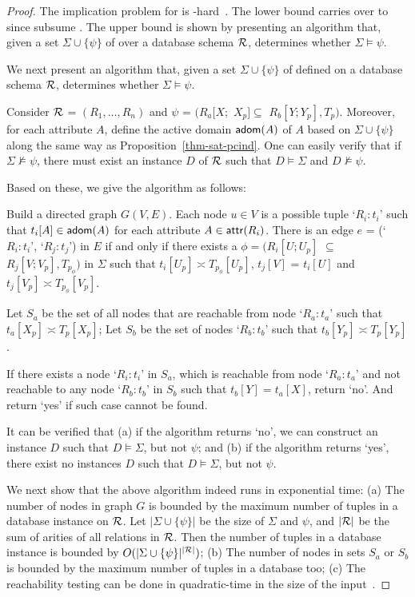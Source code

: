 \begin{proof} 
The implication problem for \CINDs is
\EXPTIME-hard~\cite{tcs-CINDs}. The lower bound carries over to \pCINDs
since \pCINDs subsume \CINDs. The \EXPTIME upper bound is shown
by presenting an \EXPTIME algorithm that, given a set
$\Sigma\cup\{\psi\}$ of \pCINDs over a database schema $\cal R$,
determines whether $\Sigma\models\psi$.

We next present an \EXPTIME algorithm that, given a set
$\Sigma\cup\{\psi\}$ of \pCINDs defined on a database schema $\cal
R$, determines whether $\Sigma\models\psi$.

Consider $\cal R$ = $(R_1,\ldots,R_n)$ and $\psi$ = $(R_a[X;$ $X_p]
\subseteq$ $R_b[Y;Y_p], T_p)$. Moreover, for each attribute $A$,
define the active domain ${\mathsf{adom}}(A)$ of $A$ based on
$\Sigma\cup\{\psi\}$ along the same way as
Proposition~\ref{thm-sat-pcind}. One can easily verify that if
$\Sigma\not\models\psi$, there must exist an instance $D$ of ${\cal
R}$ such that $D\models\Sigma$ and $D\not\models\psi$.

Based on these, we give the \EXPTIME algorithm as follows:

\bi
\item
Build a directed graph $G(V, E)$.  Each node $u\in V$ is a possible
tuple `$R_i:t_i$' such that $t_i[A]\in {\ensuremath {\mathsf{adom}}}(A)$ for each attribute
$A\in\protect\mathsf{attr}(R_i)$. There is an edge $e$ = (`$R_i:t_i$',
`$R_j:t_j$') in $E$ if and only if there exists a \pCIND $\phi =
(R_i[U; U_p]$ $\subseteq$ $ R_j[V; V_p], T_{p_{\phi}})$ in $\Sigma$
such that $t_i[U_p] \asymp T_{p_{\phi}}[U_p]$, $t_j[V]$ = $t_i[U]$
and $t_j[V_p] \asymp T_{p_{\phi}}[V_p]$.
\item
Let $S_a$ be the set of all nodes that are reachable from node
`$R_a:t_a$' such that $t_a[X_p] \asymp T_{p}[X_p]$;
 Let $S_b$ be the
set of nodes `$R_b:t_b$' such that $t_b[Y_p] \asymp T_{p}[Y_p]$.
\item
If there exists a node `$R_i:t_i$' in $S_a$, which is reachable from
node `$R_a:t_a$' and not reachable to any node `$R_b:t_b$' in $S_b$
such that $t_b[Y] = t_a[X]$, return `no'. And return `yes' if such
case cannot be found. \ei


It can be verified that (a) if the algorithm returns `no', we can
construct an instance $D$ such that $D\models\Sigma$, but not
$\psi$; and (b) if the algorithm returns `yes', there exist no
instances $D$ such that $D\models\Sigma$, but not $\psi$.

We next show that the above algorithm indeed runs in exponential
time: (a) The number of nodes in graph $G$ is bounded by the maximum
number of tuples in a database instance on $\R$. Let
$|\Sigma\cup\{\psi\}|$ be the size of $\Sigma$ and $\psi$, and
$|\cal R|$ be the sum of arities of all relations in $\cal R$. Then
the number of tuples in a database instance is bounded by
$O(|\Sigma\cup\{\psi\}|^{|\cal
 R|})$; (b) The number of nodes in sets $S_a$ or $S_b$ is bounded by
the maximum number of tuples in a database too; (c) The reachability
testing can be done in quadratic-time in the size of the
input~\cite{Papa1994}.


\end{proof}
